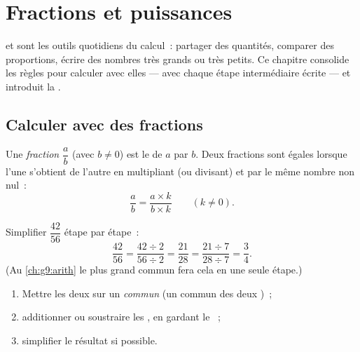 \chapter{Fractions et puissances}\label{ch:g9:fractions}

 et  sont les outils quotidiens du calcul~: partager
des quantités, comparer des proportions, écrire des nombres très grands
ou très petits. Ce chapitre consolide les règles pour calculer avec
elles --- avec chaque étape intermédiaire écrite --- et introduit la
.

\section{Calculer avec des fractions}

\begin{definition}[Fraction]\label{def:g9:fractions:fraction}
Une \emph{fraction} $\dfrac ab$ (avec $b \neq 0$) est le
 de $a$ par $b$. Deux fractions sont égales lorsque l'une
s'obtient de l'autre en multipliant (ou divisant)  et
 par le même nombre non nul~:
\[
\frac ab = \frac{a \times k}{b \times k} \qquad (k \neq 0).
\]
\end{definition}

\begin{example}\label{ex:g9:fractions:simplify}
Simplifier $\dfrac{42}{56}$ étape par étape~:
\[
\frac{42}{56} = \frac{42 \div 2}{56 \div 2} = \frac{21}{28}
= \frac{21 \div 7}{28 \div 7} = \frac34 .
\]
(Au \cref{ch:g9:arith} le plus grand commun  fera cela en une
seule étape.)
\end{example}

\begin{method}\label{met:g9:fractions:add}
\begin{enumerate}
  \item Mettre les deux  sur un \emph{ commun}
        (un  commun des deux )~;
  \item additionner ou soustraire les , en gardant le
        ~;
  \item simplifier le résultat si possible.
\end{enumerate}
\end{method}

